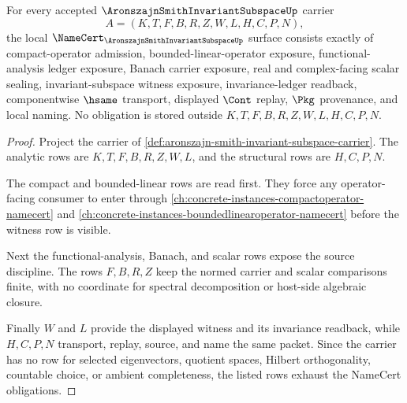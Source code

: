 \begin{theorem}
\label{thm:aronszajn-smith-invariant-subspace-namecert-obligations}
For every accepted $\AronszajnSmithInvariantSubspaceUp$ carrier
$$
A=(K,T,F,B,R,Z,W,L,H,C,P,N),
$$
the local $\NameCert_{\AronszajnSmithInvariantSubspaceUp}$ surface consists exactly of compact-operator admission, bounded-linear-operator exposure, functional-analysis ledger exposure, Banach carrier exposure, real and complex-facing scalar sealing, invariant-subspace witness exposure, invariance-ledger readback, componentwise $\hsame$ transport, displayed $\Cont$ replay, $\Pkg$ provenance, and local naming. No obligation is stored outside $K,T,F,B,R,Z,W,L,H,C,P,N$.
\end{theorem}
\begin{proof}
Project the carrier of \autoref{def:aronszajn-smith-invariant-subspace-carrier}. The analytic rows are $K,T,F,B,R,Z,W,L$, and the structural rows are $H,C,P,N$.

The compact and bounded-linear rows are read first. They force any operator-facing consumer to enter through \autoref{ch:concrete-instances-compactoperator-namecert} and \autoref{ch:concrete-instances-boundedlinearoperator-namecert} before the witness row is visible.

Next the functional-analysis, Banach, and scalar rows expose the source discipline. The rows $F,B,R,Z$ keep the normed carrier and scalar comparisons finite, with no coordinate for spectral decomposition or host-side algebraic closure.

Finally $W$ and $L$ provide the displayed witness and its invariance readback, while $H,C,P,N$ transport, replay, source, and name the same packet. Since the carrier has no row for selected eigenvectors, quotient spaces, Hilbert orthogonality, countable choice, or ambient completeness, the listed rows exhaust the NameCert obligations.
\end{proof}

